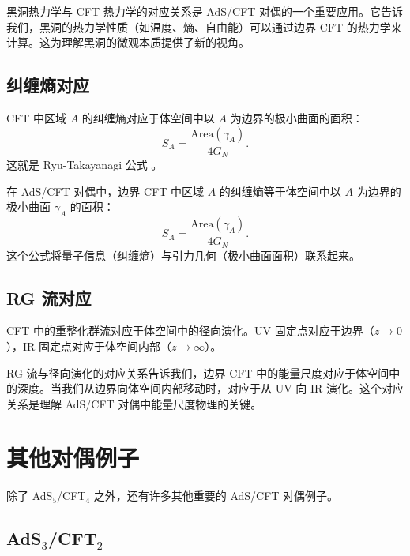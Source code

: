 \begin{remark}
黑洞热力学与 CFT 热力学的对应关系是 AdS/CFT 对偶的一个重要应用。它告诉我们，黑洞的热力学性质（如温度、熵、自由能）可以通过边界 CFT 的热力学来计算。这为理解黑洞的微观本质提供了新的视角。
\end{remark}

\subsection{纠缠熵对应}

CFT 中区域 $A$ 的纠缠熵对应于体空间中以 $A$ 为边界的极小曲面的面积：
\begin{equation}
    S_A = \frac{\text{Area}(\gamma_A)}{4G_N}.
\end{equation}
这就是 Ryu-Takayanagi 公式 \cite{Ryu2006}。

\begin{theorem}
在 AdS/CFT 对偶中，边界 CFT 中区域 $A$ 的纠缠熵等于体空间中以 $A$ 为边界的极小曲面 $\gamma_A$ 的面积：
\begin{equation}
    S_A = \frac{\text{Area}(\gamma_A)}{4G_N}.
\end{equation}
这个公式将量子信息（纠缠熵）与引力几何（极小曲面面积）联系起来。
\end{theorem}

\subsection{RG 流对应}

CFT 中的重整化群流对应于体空间中的径向演化。UV 固定点对应于边界（$z \to 0$），IR 固定点对应于体空间内部（$z \to \infty$）。

\begin{remark}[RG 流与径向演化]
RG 流与径向演化的对应关系告诉我们，边界 CFT 中的能量尺度对应于体空间中的深度。当我们从边界向体空间内部移动时，对应于从 UV 向 IR 演化。这个对应关系是理解 AdS/CFT 对偶中能量尺度物理的关键。
\end{remark}

\section{其他对偶例子}

除了 AdS$_5$/CFT$_4$ 之外，还有许多其他重要的 AdS/CFT 对偶例子。

\subsection{AdS$_3$/CFT$_2$}

